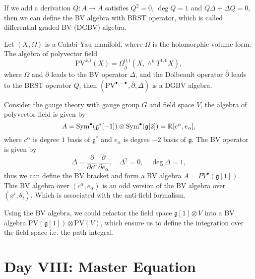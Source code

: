 \documentclass[10pt]{article}
\begin{document}
If we add a derivation $Q: A\rightarrow A$ satisfies $ Q^{2} = 0$, $\deg Q= 1$ and $ Q \Delta + \Delta Q = 0$, then we can define the BV algebra with BRST operator, which is called differential graded BV (DGBV) algebra.

\begin{example}
  Let $(X, \Omega)$ is a Calabi-Yau manifold, where $ \Omega$ is the holomorphic volume form. The algebra of polyvector field
  \begin{equation*}
    \mathrm{PV}^{k,l} (X) = \Omega^{0,l}_{\bar{\partial}}(X, \wedge^{k} T^{1,0} X),
  \end{equation*}
  where $ \Omega$ and $\partial$ leads to the BV operator $ \Delta$, and the Dolbeault operator $ \bar{\partial}$ leads to the BRST operator $ Q$, then $\left( \mathrm{PV}^{\bullet, - \bullet}, \bar{\partial}, \Delta \right)$ is a DGBV algebra.
\end{example}

\begin{example}
  Consider the gauge theory with gauge group $ G$ and field space $ V$, the algebra of polyvector field is given by
  \begin{equation*}
    A = \operatorname{Sym}^{\bullet}(\mathfrak{g}^{*}[-1]) \otimes \operatorname{Sym}^{\bullet}(\mathfrak{g}[2]) = \mathbb{R}[c^{\alpha}, e_{\alpha}],
  \end{equation*}
  where $ c^{\alpha}$ is degree $ 1$  basis of $ \mathfrak{g}^{*}$ and $ e_{\alpha}$ is degree $-2$ basis of $ \mathfrak{g}$. The BV operator is given by
  \begin{equation*}
    \Delta = \frac{\partial }{\partial c^{\alpha}} \frac{\partial }{\partial e_{\alpha}}, \quad \Delta^{2} = 0, \quad \deg \Delta = 1,
  \end{equation*}
  thus we can define the BV bracket and form a BV algebra $ A = PV^{\bullet}(\mathfrak{g}[1])$.
  This BV algebra over $(c^{\alpha}, e_{\alpha})$ is an odd version of the BV algebra over $(x^{i}, \theta_{i})$. Which is associated with the anti-field formalism.
\end{example}

Using the BV algebra, we could refactor the field space $ \mathfrak{g}[1] \otimes V$ into a BV algebra $ \mathrm{PV}(\mathfrak{g}[1]) \otimes \mathrm{PV}(V)$, which ensure us to define the integration over the field space i.e. the path integral.

\section{Day VIII: Master Equation}
\end{document}
